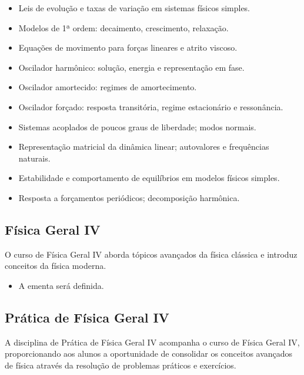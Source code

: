 \documentclass[a4paper, 12pt]{article}
\newcounter{fis}
\newcounter{mat}
\begin{document}
\begin{tcolorbox}[title=Ementa:]
    \begin{itemize}
        \item Leis de evolução e taxas de variação em sistemas físicos simples.
        \item Modelos de 1ª ordem: decaimento, crescimento, relaxação.
        \item Equações de movimento para forças lineares e atrito viscoso.
        \item Oscilador harmônico: solução, energia e representação em fase.
        \item Oscilador amortecido: regimes de amortecimento.
        \item Oscilador forçado: resposta transitória, regime estacionário e ressonância.
        \item Sistemas acoplados de poucos graus de liberdade; modos normais.
        \item Representação matricial da dinâmica linear; autovalores e frequências naturais.
        \item Estabilidade e comportamento de equilíbrios em modelos físicos simples.
        \item Resposta a forçamentos periódicos; decomposição harmônica.
    \end{itemize}
\end{tcolorbox}

\subsection{Física Geral IV}
\label{fis011}

O curso de Física Geral IV aborda tópicos avançados da física clássica e introduz
conceitos da física moderna.

\begin{tcolorbox}[title=Ementa:]
    \begin{itemize}
        \item A ementa será definida.
    \end{itemize}
\end{tcolorbox}

\subsection{Prática de Física Geral IV}
\label{fis012}

A disciplina de Prática de Física Geral IV acompanha o curso de Física Geral IV,
proporcionando aos alunos a oportunidade de consolidar os conceitos avançados de física
através da resolução de problemas práticos e exercícios.
\end{document}
